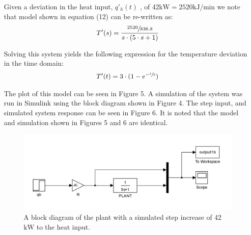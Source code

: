 \documentclass{article}
\begin{document}
Given a deviation in the heat input, $q'_h(t)$ , of 42$\si{\kilo\watt} = 2520\si{\kilo\joule\per\minute}$ we note that model shown in equation (12) can be re-written as:
\begin{align}
T'(s) = \frac{\sfrac{2520}{836.8}}{s \cdot (5 \cdot s + 1)}
\end{align}

Solving this system yields the following expression for the temperature deviation in the time domain:
\begin{align}
T'(t) = 3 \cdot (1 - e^{-\sfrac{t}{5}})
\end{align}

The plot of this model can be seen in Figure 5. A simulation of the system was run in Simulink using the block diagram shown in Figure 4. The step input, and simulated system response can be seen in Figure 6. It is noted that the model and simulation shown in Figures 5 and 6 are identical.

\begin{figure}[h]
\centering
\includegraphics[scale=0.15]{block_1b}
\caption{A block diagram of the plant with a simulated step increase of 42$\si{\kilo\watt}$ to the heat input.}
\end{figure}
\end{document}
